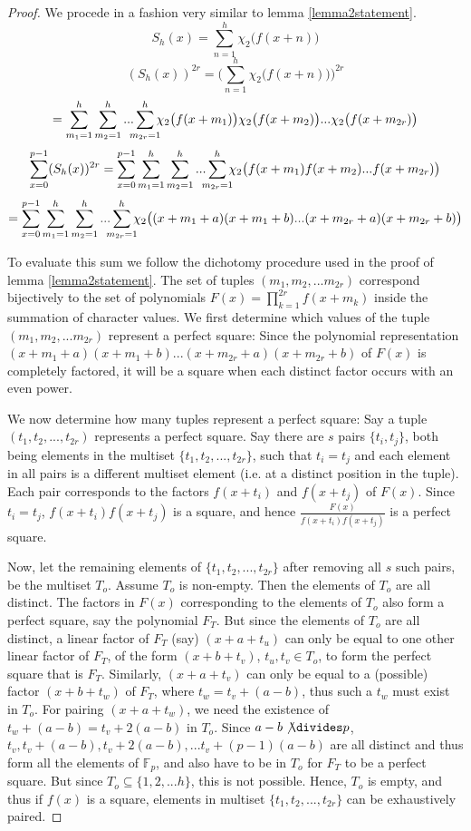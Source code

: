 \documentclass{report}
\begin{document}
\begin{proof}
We procede in a fashion very similar to lemma \ref{lemma2statement}.
\[S_h(x)=\sum\limits_{n=1}^{h} \chi_2\big(f(x+n)\big)\]
\[(S_h(x))^{2r}=\Bigg(\sum\limits_{n=1}^{h} \chi_2\big(f(x+n)\big)\Bigg)^{2r}\]
\[=\sum\limits_{m_1=1}^h\sum\limits_{m_2=1}^h...\sum\limits_{\mathclap{m_{2r}=1}}^h\chi_2\big(f(x+m_1)\big)\chi_2\big(f(x+m_2)\big)...\chi_2\big(f(x+m_{2r})\big)\]
\[\sum\limits_{x=0}^{p-1}(S_h(x))^{2r} = \sum\limits_{x=0}^{p-1}\sum\limits_{m_1=1}^h\sum\limits_{m_2=1}^h... \sum\limits_{\mathclap{m_{2r}=1}}^h\chi_2\big(f(x+m_1)f(x+m_2)...f(x+m_{2r})\big)\]
\[=\sum\limits_{x=0}^{p-1}\sum\limits_{m_1=1}^h\sum\limits_{m_2=1}^h... \sum\limits_{\mathclap{m_{2r}=1}}^h\chi_2\big((x+m_1+a)(x+m_1+b)...(x+m_{2r}+a)(x+m_{2r}+b)\big)\]


To evaluate this sum we follow the dichotomy procedure used in the proof of lemma \ref{lemma2statement}. The set of tuples $(m_1, m_2,...m_{2r})$ correspond bijectively to the set of polynomials $F(x)=\prod_{k=1}^{2r}f(x+m_k)$ inside the summation of character values. We first determine which values of the tuple $(m_1, m_2,...m_{2r})$ represent a perfect square: Since the polynomial representation $(x+m_1+a) (x+m_1+b) ... (x+m_{2r}+a) (x+m_{2r}+b)$ of $F(x)$ is completely factored, it will be a square when each distinct factor occurs with an even power.

We now determine how many tuples represent a perfect square: Say a tuple $(t_1, t_2,...,t_{2r})$ represents a perfect square. Say there are $s$ pairs $\{t_i, t_j\}$, both being elements in the multiset $\{t_1, t_2,...,t_{2r}\}$, such that $t_i=t_j$ and each element in all pairs is a different multiset element (i.e. at a distinct position in the tuple). Each pair corresponds to the factors $f(x+t_i)$ and $f(x+t_j)$ of $F(x)$. Since $t_i=t_j$, $f(x+t_i)f(x+t_j)$ is a square, and hence $\frac{F(x)}{f(x+t_i)f(x+t_j)}$ is a perfect square.

Now, let the remaining elements of $\{t_1, t_2,...,t_{2r}\}$ after removing all $s$ such pairs, be the multiset $T_o$. Assume $T_o$ is non-empty. Then the elements of $T_o$ are all distinct. The factors in $F(x)$ corresponding to the elements of $T_o$ also form a perfect square, say the polynomial $F_T$. But since the elements of $T_o$ are all distinct, a linear factor of $F_T$ (say) $(x+a+t_u)$ can only be equal to one other linear factor of $F_T$, of the form $(x+b+t_v)$, $t_u,t_v\in T_o$, to form the perfect square that is $F_T$.
Similarly, $(x+a+t_v)$ can only be equal to a (possible) factor $(x+b+t_w)$ of $F_T$, where $t_w=t_v+(a-b)$, thus such a $t_w$ must exist in $T_o$. For pairing $(x+a+t_w)$, we need the existence of $t_w+(a-b)=t_v+2(a-b)$ in $T_o$. Since $a-b \not\divides p$, $t_v, t_v+(a-b), t_v+2(a-b),...t_v+(p-1)(a-b)$ are all distinct and thus form all the elements of $\mathbb{F}_p$, and also have to be in $T_o$ for $F_T$ to be a perfect square. But since $T_o\subseteq \{1,2,...h\}$, this is not possible. Hence, $T_o$ is empty, and thus if $f(x)$ is a square, elements in multiset $\{t_1, t_2,...,t_{2r}\}$ can be exhaustively paired.


\end{proof}
\end{document}
